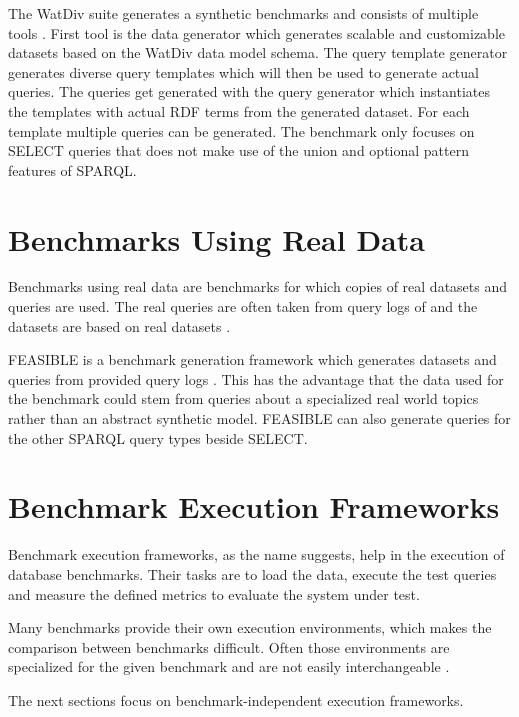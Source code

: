 The WatDiv suite generates a synthetic benchmarks and consists of multiple tools \cite{alucDiversifiedStressTesting2014}.
First tool is the data generator which generates scalable and customizable datasets based on the WatDiv data model schema.
The query template generator generates diverse query templates which will then be used to generate actual queries.
The queries get generated with the query generator which instantiates the templates with actual RDF terms from the generated dataset.
For each template multiple queries can be generated.
The benchmark only focuses on SELECT queries that does not make use of the union and optional pattern features of SPARQL.

\section{Benchmarks Using Real Data}
\label{sec:benchmarks_real_data}
Benchmarks using real data are benchmarks for which copies of real datasets and queries are used.
The real queries are often taken from query logs of \tsp{} and the datasets are based on real datasets \cite{morseyDBpediaSPARQLBenchmark2011, saleemFEASIBLEFeatureBasedSPARQL2015}.

FEASIBLE is a benchmark generation framework which generates datasets and queries from provided query logs \cite{saleemFEASIBLEFeatureBasedSPARQL2015}.
This has the advantage that the data used for the benchmark could stem from queries about a specialized real world topics rather than an abstract synthetic model.
FEASIBLE can also generate queries for the other SPARQL query types beside SELECT.

\section{Benchmark Execution Frameworks}
\label{sec:benchmark_frameworks}
Benchmark execution frameworks, as the name suggests, help in the execution of database benchmarks.
Their tasks are to load the data, execute the test queries and measure the defined metrics to evaluate the system under test.

Many benchmarks provide their own execution environments, which makes the comparison between benchmarks difficult.
Often those environments are specialized for the given benchmark and are not easily interchangeable \cite{conradsIguanaGenericFramework2017}.

The next sections focus on benchmark-independent execution frameworks.


